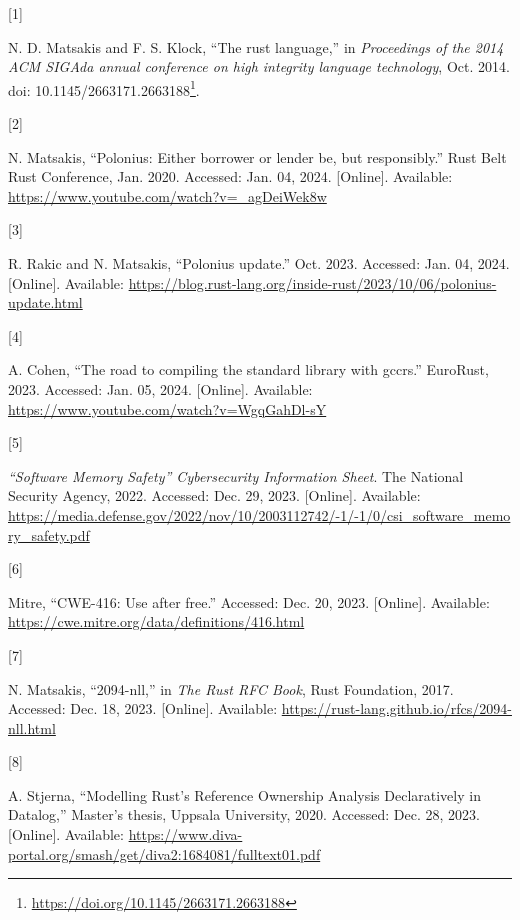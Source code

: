 \documentclass[
  11pt,
  twoside,symmetric]{report}
\newlength{\cslhangindent}
\newlength{\csllabelwidth}
\newenvironment{CSLReferences}[2] %
 {\begin{list}{}{%
  \setlength{\itemindent}{0pt}
  \setlength{\leftmargin}{0pt}
  \setlength{\parsep}{0pt}
  \ifodd #1
   \setlength{\leftmargin}{\cslhangindent}
   \setlength{\itemindent}{-1\cslhangindent}
  \fi
  \setlength{\itemsep}{#2\baselineskip}}}
 {\end{list}}
\newcommand{\CSLLeftMargin}[1]{\parbox[t]{\csllabelwidth}{\strut#1\strut}}
\newcommand{\CSLRightInline}[1]{\parbox[t]{\linewidth - \csllabelwidth}{\strut#1\strut}}
\DeclareRobustCommand{\href}[2]{#2\footnote{\url{#1}}}
\begin{document}
\label{refs}
\begin{CSLReferences}{0}{0}
\CSLLeftMargin{{[}1{]} }%
\CSLRightInline{N. D. Matsakis and F. S. Klock, {``The rust language,''}
in \emph{Proceedings of the 2014 ACM SIGAda annual conference on high
integrity language technology}, Oct. 2014. doi:
\href{https://doi.org/10.1145/2663171.2663188}{10.1145/2663171.2663188}.}

\CSLLeftMargin{{[}2{]} }%
\CSLRightInline{N. Matsakis, {``Polonius: Either borrower or lender be,
but responsibly.''} Rust Belt Rust Conference, Jan. 2020. Accessed: Jan.
04, 2024. {[}Online{]}. Available:
\url{https://www.youtube.com/watch?v=_agDeiWek8w}}

\CSLLeftMargin{{[}3{]} }%
\CSLRightInline{R. Rakic and N. Matsakis, {``Polonius update.''} Oct.
2023. Accessed: Jan. 04, 2024. {[}Online{]}. Available:
\url{https://blog.rust-lang.org/inside-rust/2023/10/06/polonius-update.html}}

\CSLLeftMargin{{[}4{]} }%
\CSLRightInline{A. Cohen, {``The road to compiling the standard library
with gccrs.''} EuroRust, 2023. Accessed: Jan. 05, 2024. {[}Online{]}.
Available: \url{https://www.youtube.com/watch?v=WgqGahDl-sY}}

\CSLLeftMargin{{[}5{]} }%
\CSLRightInline{\emph{{{``Software Memory Safety''}} {C}ybersecurity
{I}nformation {S}heet}. The National Security Agency, 2022. Accessed:
Dec. 29, 2023. {[}Online{]}. Available:
\url{https://media.defense.gov/2022/nov/10/2003112742/-1/-1/0/csi_software_memory_safety.pdf}}

\CSLLeftMargin{{[}6{]} }%
\CSLRightInline{Mitre, {``CWE-416: Use after free.''} Accessed: Dec. 20,
2023. {[}Online{]}. Available:
\url{https://cwe.mitre.org/data/definitions/416.html}}

\CSLLeftMargin{{[}7{]} }%
\CSLRightInline{N. Matsakis, {``2094-nll,''} in \emph{The {R}ust {RFC}
{B}ook}, Rust Foundation, 2017. Accessed: Dec. 18, 2023. {[}Online{]}.
Available: \url{https://rust-lang.github.io/rfcs/2094-nll.html}}

\CSLLeftMargin{{[}8{]} }%
\CSLRightInline{A. Stjerna, {``{M}odelling {R}ust's {R}eference
{O}wnership {A}nalysis {D}eclaratively in {D}atalog,''} Master's thesis,
Uppsala University, 2020. Accessed: Dec. 28, 2023. {[}Online{]}.
Available:
\url{https://www.diva-portal.org/smash/get/diva2:1684081/fulltext01.pdf}}


\end{CSLReferences}
\end{document}
